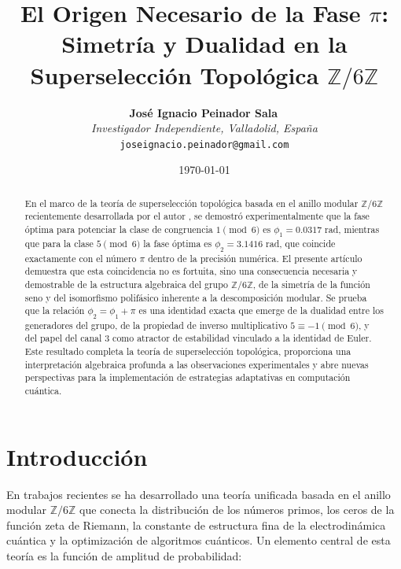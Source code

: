 \documentclass[12pt,a4paper]{article}
\theoremstyle{plain}
\theoremstyle{definition}
\theoremstyle{remark}
\begin{document}
\title{El Origen Necesario de la Fase $\pi$: Simetría y Dualidad en la Superselección Topológica $\mathbb{Z}/6\mathbb{Z}$}

\author{
  \textbf{José Ignacio Peinador Sala}\, \\
  \textit{Investigador Independiente, Valladolid, España} \\
  \texttt{joseignacio.peinador@gmail.com}
}

\date{\today}

\begin{abstract}
En el marco de la teoría de superselección topológica basada en el anillo modular $\mathbb{Z}/6\mathbb{Z}$ recientemente desarrollada por el autor \cite{PeinadorGenesis, PeinadorSpectrum, PeinadorDSP}, se demostró experimentalmente que la fase óptima para potenciar la clase de congruencia $1 \pmod 6$ es $\phi_1 = 0.0317$ rad, mientras que para la clase $5 \pmod 6$ la fase óptima es $\phi_2 = 3.1416$ rad, que coincide exactamente con el número $\pi$ dentro de la precisión numérica. El presente artículo demuestra que esta coincidencia no es fortuita, sino una consecuencia necesaria y demostrable de la estructura algebraica del grupo $\mathbb{Z}/6\mathbb{Z}$, de la simetría de la función seno y del isomorfismo polifásico inherente a la descomposición modular. Se prueba que la relación $\phi_2 = \phi_1 + \pi$ es una identidad exacta que emerge de la dualidad entre los generadores del grupo, de la propiedad de inverso multiplicativo $5 \equiv -1 \pmod{6}$, y del papel del canal $3$ como atractor de estabilidad vinculado a la identidad de Euler. Este resultado completa la teoría de superselección topológica, proporciona una interpretación algebraica profunda a las observaciones experimentales y abre nuevas perspectivas para la implementación de estrategias adaptativas en computación cuántica.
\end{abstract}

\tableofcontents
\newpage

\section{Introducción}

En trabajos recientes \cite{PeinadorGenesis, PeinadorSpectrum, PeinadorDSP} se ha desarrollado una teoría unificada basada en el anillo modular $\mathbb{Z}/6\mathbb{Z}$ que conecta la distribución de los números primos, los ceros de la función zeta de Riemann, la constante de estructura fina de la electrodinámica cuántica y la optimización de algoritmos cuánticos. Un elemento central de esta teoría es la función de amplitud de probabilidad:
\end{document}

